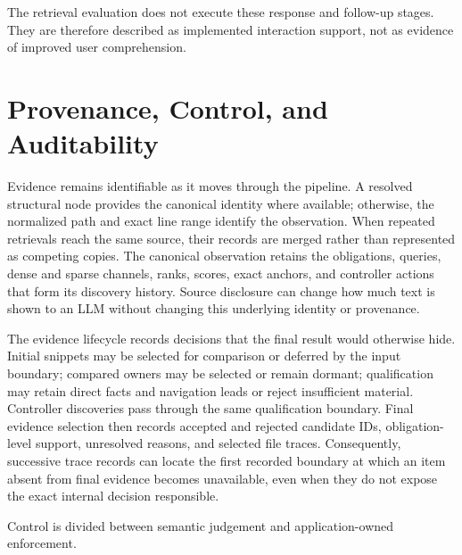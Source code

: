 The retrieval evaluation does not execute these response and follow-up stages. They are therefore described as implemented interaction support, not as evidence of improved user comprehension.

\section{Provenance, Control, and Auditability}\label{sec:provenance-control-and-auditability}

Evidence remains identifiable as it moves through the pipeline. A resolved structural node provides the canonical identity where available; otherwise, the normalized path and exact line range identify the observation. When repeated retrievals reach the same source, their records are merged rather than represented as competing copies. The canonical observation retains the obligations, queries, dense and sparse channels, ranks, scores, exact anchors, and controller actions that form its discovery history. Source disclosure can change how much text is shown to an LLM without changing this underlying identity or provenance.

The evidence lifecycle records decisions that the final result would otherwise hide. Initial snippets may be selected for comparison or deferred by the input boundary; compared owners may be selected or remain dormant; qualification may retain direct facts and navigation leads or reject insufficient material. Controller discoveries pass through the same qualification boundary. Final evidence selection then records accepted and rejected candidate IDs, obligation-level support, unresolved reasons, and selected file traces. Consequently, successive trace records can locate the first recorded boundary at which an item absent from final evidence becomes unavailable, even when they do not expose the exact internal decision responsible.

Control is divided between semantic judgement and application-owned enforcement.

